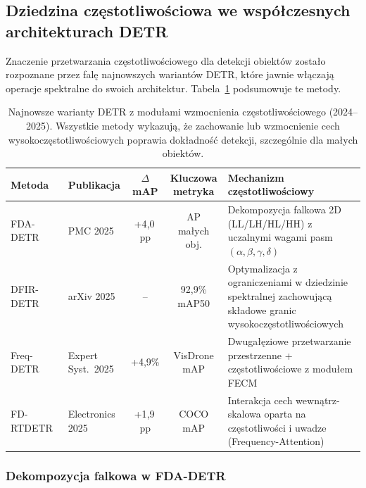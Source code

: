 \subsection{Dziedzina częstotliwościowa we współczesnych architekturach DETR}
\label{sec:detr_frequency}

Znaczenie przetwarzania częstotliwościowego dla detekcji obiektów zostało
rozpoznane przez falę najnowszych wariantów DETR, które jawnie włączają
operacje spektralne do swoich architektur.
Tabela~\ref{tab:freq_detr_variants} podsumowuje te metody.

\begin{table}[t]
\centering
\caption{Najnowsze warianty DETR z modułami wzmocnienia częstotliwościowego
         (2024--2025).  Wszystkie metody wykazują, że zachowanie lub wzmocnienie
         cech wysokoczęstotliwościowych poprawia dokładność detekcji,
         szczególnie dla małych obiektów.}
\label{tab:freq_detr_variants}
\begin{tabular}{llccp{5.5cm}}
\toprule
\textbf{Metoda} & \textbf{Publikacja} &
    \textbf{$\Delta$mAP} & \textbf{Kluczowa metryka} &
    \textbf{Mechanizm częstotliwościowy} \\
\midrule
FDA-DETR~\cite{fda_detr2025}
    & PMC 2025
    & +4{,}0\,pp
    & AP małych obj.
    & Dekompozycja falkowa 2D (LL/LH/HL/HH) z uczalnymi
      wagami pasm $(\alpha, \beta, \gamma, \delta)$ \\[4pt]
DFIR-DETR~\cite{dfir_detr2025}
    & arXiv 2025
    & --
    & 92{,}9\% mAP50
    & Optymalizacja z ograniczeniami w dziedzinie spektralnej
      zachowującą składowe granic wysokoczęstotliwościowych \\[4pt]
Freq-DETR~\cite{freq_detr2025}
    & Expert Syst.\ 2025
    & +4{,}9\%
    & VisDrone mAP
    & Dwugałęziowe przetwarzanie przestrzenne + częstotliwościowe
      z modułem FECM \\[4pt]
FD-RTDETR~\cite{fd_rtdetr2025}
    & Electronics 2025
    & +1{,}9\,pp
    & COCO mAP
    & Interakcja cech wewnątrz-skalowa oparta na częstotliwości
      i uwadze (Frequency-Attention) \\
\bottomrule
\end{tabular}
\end{table}

\subsubsection{Dekompozycja falkowa w FDA-DETR}

